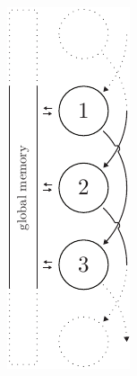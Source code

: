 \begin{figure}[h!]
\begin{minipage}[t]{0.20\textwidth}
    \label{fig:total-scheduling}
  \end{minipage}
  \hfill
  \vrule
  \hfill
  \begin{minipage}[t]{0.20\textwidth}
    \centering
    \includegraphics[page=2, height=2\linewidth]{../resources/invariance.pdf}

\end{minipage}
\end{figure}
